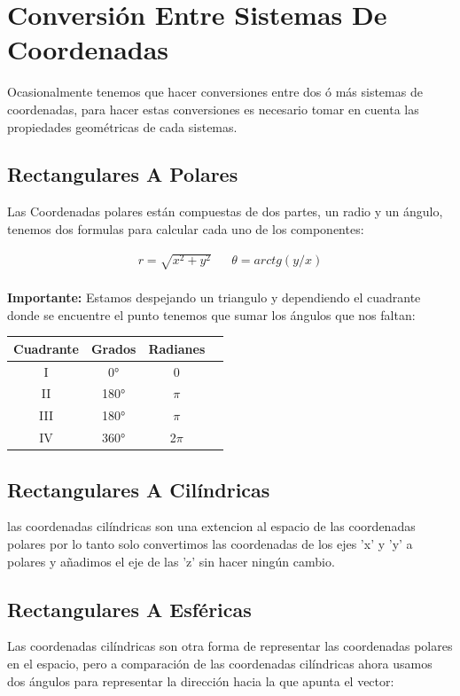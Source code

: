 \documentclass{article}
\begin{document}
\section{Conversión Entre Sistemas De Coordenadas}
\label{sec:org283dfa0}
Ocasionalmente tenemos que hacer conversiones entre dos ó más sistemas de coordenadas, para hacer estas conversiones es necesario tomar en cuenta las propiedades geométricas de cada sistemas.

\subsection{Rectangulares A Polares}
\label{sec:orgb71abb5}
Las Coordenadas polares están compuestas de dos partes, un radio y un ángulo, tenemos dos formulas para calcular cada uno de los componentes: 

\[\begin{aligned}
 r = \sqrt{x^2+y^2} && \theta = arctg\left(y/x\right) \\
\end{aligned}\] 

\textbf{Importante:} Estamos despejando un triangulo y dependiendo el cuadrante donde se encuentre el punto tenemos que sumar los ángulos que nos faltan: 

\begin{center}
\label{tab:org3fcd8c7}
\begin{tabular}{|c|c|c|c|}
\hline
Cuadrante & Grados & Radianes\\
\hline
I & 0° & 0\\
II & 180° & \(\pi\)\\
III & 180° & \(\pi\)\\
IV & 360° & 2\(\pi\)\\
\hline
\end{tabular}
\end{center}


\subsection{Rectangulares A Cilíndricas}
\label{sec:orgd72b0b4}
las coordenadas cilíndricas son una extencion al espacio de las coordenadas polares por lo tanto solo convertimos las coordenadas de los ejes 'x' y 'y' a polares y añadimos el eje de las 'z' sin hacer ningún cambio.

\subsection{Rectangulares A Esféricas}
\label{sec:org36858a9}
Las coordenadas cilíndricas son otra forma de representar las coordenadas polares en el espacio, pero a comparación de las coordenadas cilíndricas ahora usamos dos ángulos para representar la dirección hacia la que apunta el vector: 
\end{document}
